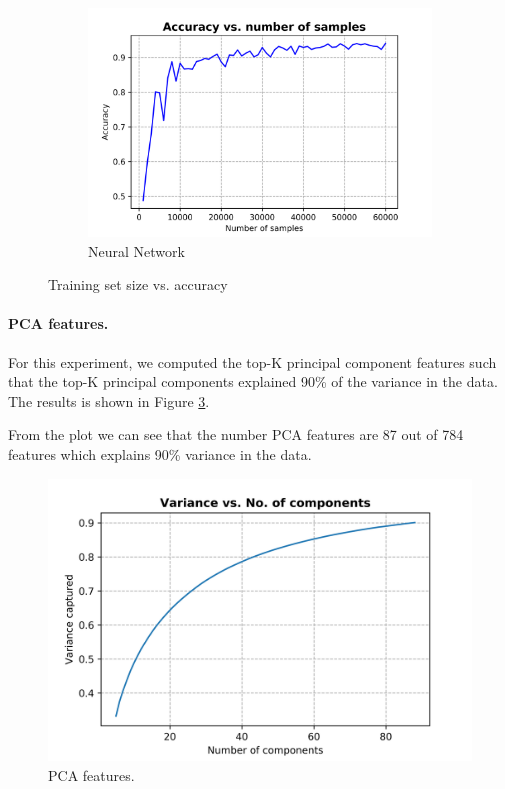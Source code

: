 \documentclass[10pt]{scrartcl}
\begin{document}
\begin{figure}[H]
\begin{subfigure}{0.4\linewidth}
		\includegraphics[width=1\linewidth]{figures/accuracy_vs_samples_neural_net_default}
		\caption{Neural Network}\label{fig:1b}
	\end{subfigure}
	\caption{Training set size vs. accuracy}\label{fig:1}
\end{figure}

\paragraph{PCA features.}
For this experiment, we computed the top-K principal component features such that the top-K principal components explained 90\% of the variance in the data. 
The results is shown in Figure \ref{fig:pca_features}.

From the plot we can see that the number PCA features are 87 out of 784 features which explains 90\% variance in the data.
\begin{figure}[H]
\centering
\includegraphics[width=0.5\linewidth]{figures/pca_variance_vs_no_comp.png}
\caption{PCA features. \label{fig:pca_features}}
\end{figure}
\end{document}
